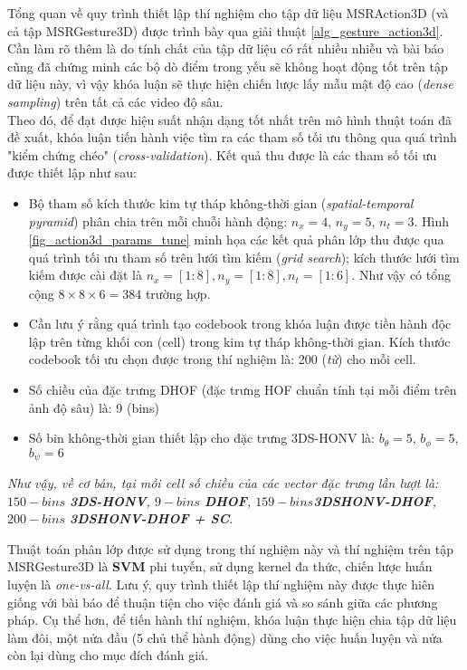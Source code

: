 Tổng quan về quy trình thiết lập thí nghiệm cho tập dữ liệu MSRAction3D (và cả tập MSRGesture3D) được trình bày qua giải thuật \ref{alg_gesture_action3d}. Cần làm rõ thêm là do tính chất của tập dữ liệu có rất nhiều nhiễu và bài báo \cite{Omar_HON4D} cũng đã chứng minh các bộ dò điểm trong yếu sẽ không hoạt động tốt trên tập dữ liệu này, vì vậy khóa luận sẽ thực hiện chiến lược lấy mẫu mật độ cao (\textit{dense sampling}) trên tất cả các video độ sâu.\\
Theo đó, để đạt được hiệu suất nhận dạng tốt nhất trên mô hình thuật toán đã đề xuất, khóa luận tiến hành việc tìm ra các tham số tối ưu thông qua quá trình "kiểm chứng chéo" (\textit{cross-validation}). Kết quả thu được là các tham số tối ưu được thiết lập như sau:
\begin{itemize}
	\item Bộ tham số kích thước kim tự tháp không-thời gian (\textit{spatial-temporal pyramid}) phân chia trên mỗi chuỗi hành động: $n_x=4$, $n_y=5$, $n_t=3$. Hình \ref{fig_action3d_params_tune} minh họa các kết quả phân lớp thu được qua quá trình tối ưu tham số trên lưới tìm kiếm (\textit{grid search}); kích thước lưới tìm kiếm được cài đặt là $n_x=[1:8],n_y=[1:8],n_t=[1:6]$. Như vậy có tổng cộng $8\times8\times6=384$ trường hợp.
	\item Cần lưu ý rằng quá trình tạo codebook trong khóa luận được tiền hành độc lập trên từng khối con (cell) trong kim tự tháp không-thời gian. Kích thước codebook tối ưu chọn được trong thí nghiệm là: 200 (\textit{từ}) cho mỗi cell.
	\item Số chiều của đặc trưng DHOF (đặc trưng HOF chuẩn \cite{Dalal_HOF} tính tại mỗi điểm trên ảnh độ sâu) là: 9 (bins)
	\item Số bin không-thời gian thiết lập cho đặc trưng 3DS-HONV là: $b_\theta = 5$, $b_\phi = 5$, $b_\psi = 6$
\end{itemize}
\textit{Như vậy, về cơ bản, tại mỗi cell số chiều của các vector đặc trưng lần lượt là: $150-bins$ \textbf{3DS-HONV}, $9-bins$ \textbf{DHOF}, $159-bins$\textbf{3DSHONV-DHOF}, $200-bins$ \textbf{3DSHONV-DHOF + SC}}. 

Thuật toán phân lớp được sử dụng trong thí nghiệm này và thí nghiệm trên tập MSRGesture3D là \textbf{SVM} phi tuyến, sử dụng kernel đa thức, chiến lược huấn luyện là \textit{one-vs-all}. Lưu ý, quy trình thiết lập thí nghiệm này được thực hiên giống với bài báo \cite{Omar_HON4D} để thuận tiện cho việc đánh giá và so sánh giữa các phương pháp. Cụ thể hơn, để tiến hành thí nghiệm, khóa luận thực hiện chia tập dữ liệu làm đôi, một nửa đầu (5 chủ thể hành động) dùng cho việc huấn luyện và nửa còn lại dùng cho mục đích đánh giá. 

